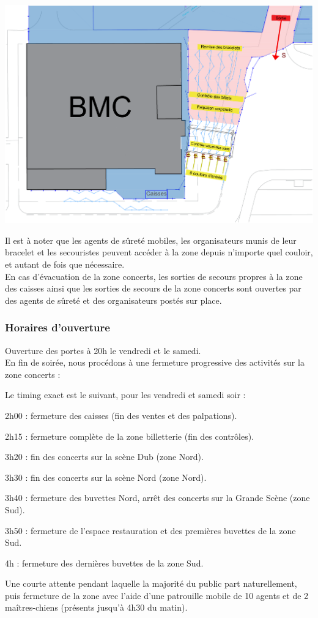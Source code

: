 \documentclass[hidelinks, paper=a4, fontsize=13pt]{report}
\begin{document}
\begin{center}
	\includegraphics[width=.8\textwidth,keepaspectratio]{Exports/Plan_24h_44eme-Entree_Etapes}
\end{center}

Il est à noter que les agents de sûreté mobiles, les organisateurs munis de leur bracelet et les secouristes peuvent accéder à la zone depuis n’importe quel couloir, et autant de fois que nécessaire.\\

En cas d’évacuation de la zone concerts, les sorties de secours propres à la zone des caisses  ainsi que les sorties de secours de la zone concerts sont ouvertes par des agents de sûreté et des organisateurs postés sur place. 

\subsubsection{Horaires d’ouverture}
Ouverture des portes à 20h le vendredi et le samedi.\\

En fin de soirée, nous procédons à une fermeture progressive des activités sur la zone concerts : 

Le timing exact est le suivant, pour les vendredi et samedi soir :
\begin{list}{•}{}
	\item 2h00 : fermeture des caisses (fin des ventes et des palpations).
	\item 2h15 : fermeture complète de la zone billetterie (fin des contrôles). 
	\item 3h20 : fin des concerts sur la scène Dub (zone Nord).
	\item 3h30 : fin des concerts sur la scène Nord (zone Nord).
	\item 3h40 : fermeture des buvettes Nord, arrêt des concerts sur la Grande Scène (zone Sud).
	\item 3h50 : fermeture de l'espace restauration et des premières buvettes de la zone Sud.
	\item 4h : fermeture des dernières buvettes de la zone Sud.
	\item Une courte attente pendant laquelle la majorité du public part naturellement, puis fermeture de la zone avec l’aide d’une patrouille mobile de 10 agents et de 2 maîtres-chiens (présents jusqu’à 4h30 du matin).
\end{list}
\end{document}
